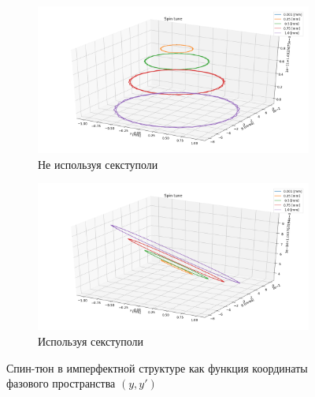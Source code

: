 \documentclass{article}     %
\begin{document}
\begin{figure}[h]
  \centering
  \begin{subfigure}{\linewidth}
    \centering
    \includegraphics[width=\linewidth]{../img/IPAC19/ST_VS_YB_IMPERFECT_UNOPT}
    \caption{Не используя секступоли}
  \end{subfigure}
  \begin{subfigure}{\linewidth}
    \centering
    \includegraphics[width=\linewidth]{../img/IPAC19/ST_VS_YB_IMPERFECT_OPTIM}
    \caption{Используя секступоли\label{fig:spin_tune_optim}}
  \end{subfigure}
  \caption{Спин-тюн в имперфектной структуре как функция координаты
    фазового пространства $(y, y')$\label{fig:spin_tune}}
\end{figure}
\end{document}
